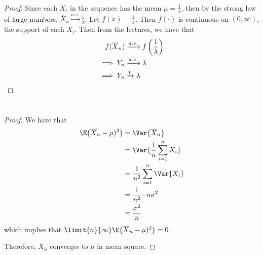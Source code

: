 \documentclass[%
  hwnumber=8,%
  studentnumber=20053722,%
  {name=Bryan Hoang}%
]{%
  mthe353answer%
}
\begin{document}
  \begin{questions}
    \setcounter{question}{1}
    \question{}\
    \begin{parts}
      \part{}
      \begin{solution}
        \begin{proof}
          Since each \(X_i\) in the sequence has the mean \(\mu = \frac{1}{\lambda}\),
          then by the strong law of large numbers, \(\overline{X}_n \xrightarrow{a.s.}
          \frac{1}{\lambda}\). Let \(f(x) = \frac{1}{x}\). Then \(f(\cdot)\) is
          continuous on \((0,\infty)\), the support of each \(X_i\). Then from
          the lectures, we have that
          \begin{align*}
            f(\overline{X}_n) &\xrightarrow{a.s.} f\left(\frac{1}{\lambda}\right)\\
            \implies Y_n &\xrightarrow{a.s.} \lambda\\
            \implies Y_n &\xrightarrow{p} \lambda \qedhere
          \end{align*}
        \end{proof}
      \end{solution}
      \part{}
      \begin{solution}
        \begin{proof}
          We have that
          \begin{align*}
            \E{{\overline{X}_n-\mu)^2}} &= \Var{\overline{X}_n}\\
            &= \Var{\frac{1}{n}\sum_{i=1}^n X_i}\\
            &= \frac{1}{n^2}\sum_{i=1}^n \Var{X_i}\\
            &= \frac{1}{n^2} \cdot n\sigma^2\\
            &= \frac{\sigma^2}{n}
          \end{align*}
          which implies that \(\limit{n}{\infty} \E{{\overline{X}_n-\mu)^2}} = 0\).

          Therefore, \(\overline{X}_n\) converges to \(\mu\) in mean square.
        \end{proof}
      \end{solution}
    \end{parts}
  \end{questions}
\end{document}
